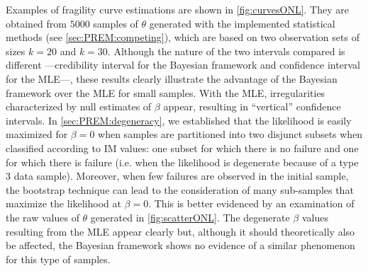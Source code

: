 Examples of fragility curve estimations are shown in \cref{fig:curvesONL}. They are obtained from $5000$ samples of $\theta$ generated with the implemented statistical methods (see \cref{sec:PREM:competing}), which are based on two observation sets of sizes $k=20$ and $k=30$. Although the nature of the two intervals compared is different ---credibility interval for the Bayesian framework and confidence interval for the MLE---, these results clearly illustrate the advantage of the Bayesian framework over the MLE for small samples. With the MLE, irregularities characterized by null estimates of $\beta$ appear, resulting in ``vertical'' confidence intervals. In \cref{sec:PREM:degeneracy}, we established that the likelihood is easily maximized for $\beta=0$ when samples are partitioned into two disjunct subsets when classified according to IM values: one subset for which there is no failure and one for which there is failure (i.e. when the likelihood is degenerate because of a type 3 data sample). Moreover, when few failures are observed in the initial sample, the bootstrap technique can lead to the consideration of many sub-samples that maximize the likelihood at $\beta=0$. This is better evidenced by an examination of the raw values of $\theta$ generated in \cref{fig:scatterONL}. The degenerate $\beta$ values resulting from the MLE appear clearly but, although it should theoretically also be affected, the Bayesian framework shows no evidence of a similar phenomenon for this type of samples.



